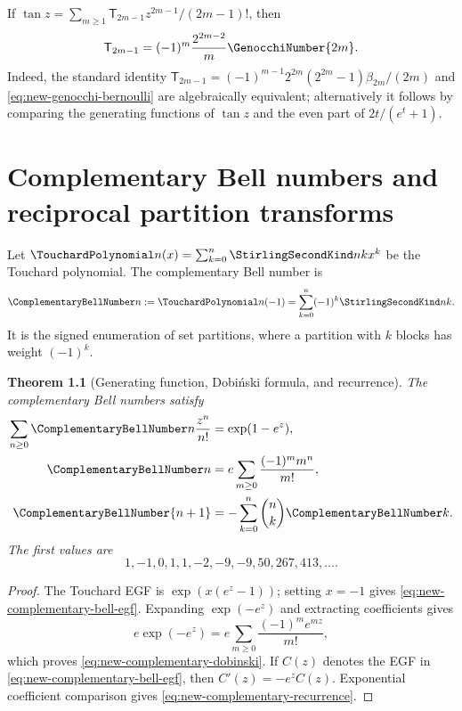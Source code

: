 \documentclass[11pt,a4paper,oneside,openany]{book}
\newtheorem{theorem}{Theorem}[chapter]
\theoremstyle{definition}
\theoremstyle{remark}
\begin{document}
If $\tan z=\sum_{m\ge1}\mathsf T_{2m-1}z^{2m-1}/(2m-1)!$, then
\begin{equation}\label{eq:new-tangent-genocchi}
 \mathsf T_{2m-1}=(-1)^m\frac{2^{2m-2}}{m}\GenocchiNumber{2m}.
\end{equation}
Indeed, the standard identity
$\mathsf T_{2m-1}=(-1)^{m-1}2^{2m}(2^{2m}-1)\beta_{2m}/(2m)$ and
\eqref{eq:new-genocchi-bernoulli} are algebraically equivalent; alternatively
it follows by comparing the generating functions of $\tan z$ and the even
part of $2t/(e^t+1)$.

\chapter{Complementary Bell numbers and reciprocal partition transforms}
\label{ch:complementary-bell}

Let $\TouchardPolynomial n(x)=\sum_{k=0}^n\StirlingSecondKind nk x^k$ be the Touchard polynomial.
The complementary Bell number is
\begin{equation}\label{eq:new-complementary-bell-def}
 \ComplementaryBellNumber n:=\TouchardPolynomial n(-1)=\sum_{k=0}^n(-1)^k\StirlingSecondKind nk.
\end{equation}
It is the signed enumeration of set partitions, where a partition with $k$
blocks has weight $(-1)^k$.

\begin{theorem}[Generating function, Dobiński formula, and recurrence]
\label{thm:new-complementary-bell}
The complementary Bell numbers satisfy
\begin{align}
 \sum_{n\ge0}\ComplementaryBellNumber n\frac{z^n}{n!}
 &=\exp(1-e^z),
 \label{eq:new-complementary-bell-egf}\\
 \ComplementaryBellNumber n
 &=e\sum_{m\ge0}\frac{(-1)^m m^n}{m!},
 \label{eq:new-complementary-dobinski}\\
 \ComplementaryBellNumber{n+1}
 &=-\sum_{k=0}^n\binom nk\ComplementaryBellNumber k.
 \label{eq:new-complementary-recurrence}
\end{align}
The first values are
\[
 1,-1,0,1,1,-2,-9,-9,50,267,413,\ldots.
\]
\end{theorem}

\begin{proof}
The Touchard EGF is $\exp(x(e^z-1))$; setting $x=-1$ gives
\eqref{eq:new-complementary-bell-egf}.  Expanding
$\exp(-e^z)$ and extracting coefficients gives
\[
 e\exp(-e^z)=e\sum_{m\ge0}\frac{(-1)^m e^{mz}}{m!},
\]
which proves \eqref{eq:new-complementary-dobinski}.  If $C(z)$ denotes the
EGF in \eqref{eq:new-complementary-bell-egf}, then
$C'(z)=-e^zC(z)$.  Exponential coefficient comparison gives
\eqref{eq:new-complementary-recurrence}.
\end{proof}
\end{document}
